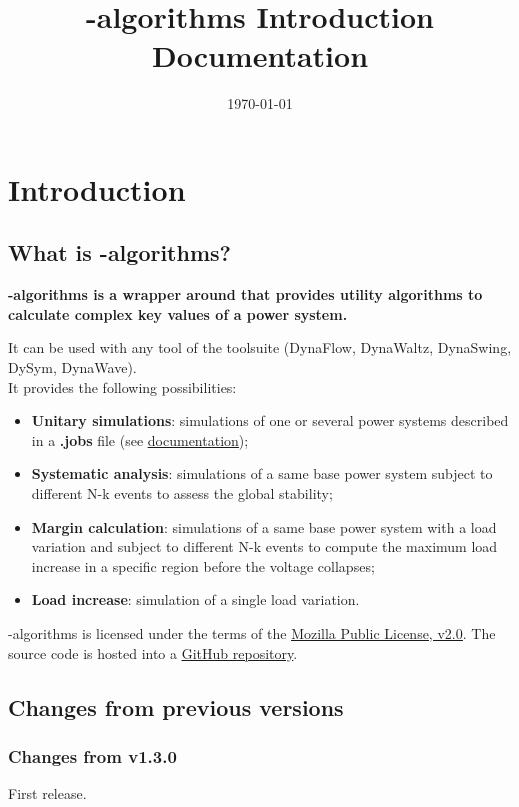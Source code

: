 \documentclass[a4paper, 12pt]{report}
\begin{document}
\title{\Dynawo-algorithms Introduction Documentation}
\date\today

\maketitle
\tableofcontents

\chapter{Introduction}

\section{What is \Dynawo-algorithms?}

\textbf{\Dynawo-algorithms is a wrapper around  \href{https://dynawo.github.io/}{\underline{\Dynawo}} 
that provides utility algorithms to calculate complex key values of a power system.} 

It can be used with any tool of the \Dynawo toolsuite (DynaFlow, DynaWaltz, DynaSwing, DySym, DynaWave).\\

It provides the following possibilities:
\begin{itemize}
  \item \textbf{Unitary simulations}: simulations of one or several power systems described in a \textbf{.jobs} file 
  (see \href{https://github.com/dynawo/dynawo/releases/download/v1.3.0/DynawoDocumentation.pdf}{\underline{\Dynawo documentation}});
  \item \textbf{Systematic analysis}: simulations of a same base power system subject to different N-k events to assess the global stability;
  \item \textbf{Margin calculation}: simulations of a same base power system with a load variation and subject to different N-k events to compute 
  the maximum load increase in a specific region before the voltage collapses;
  \item \textbf{Load increase}: simulation of a single load variation.
\end{itemize}

\Dynawo-algorithms is licensed under the terms of the \href{http://mozilla.org/MPL/2.0}{\underline{Mozilla Public License, v2.0}}.
The source code is hosted into a \href{https://github.com/dynawo/dynawo-algorithms} {\underline{GitHub repository}}. \\

\section{Changes from previous versions}

\subsection{Changes from v1.3.0}
First release.
\end{document}
